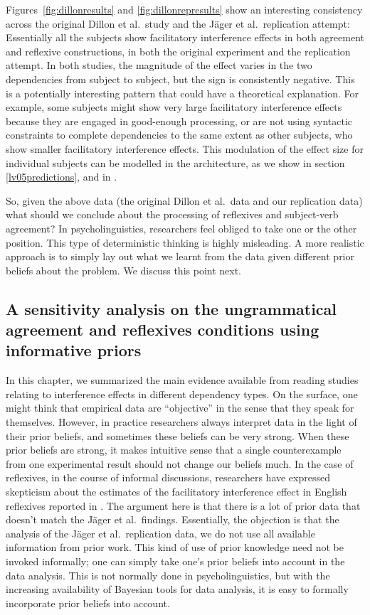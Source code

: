 \documentclass{cambridge7A}\usepackage[]{graphicx}\usepackage[]{color}
\begin{document}
Figures~\ref{fig:dillonresults} and \ref{fig:dillonrepresults} show an interesting consistency across the original Dillon et al.\ study and the J\"ager et al.\ replication attempt: Essentially all the subjects show facilitatory interference effects in both agreement and reflexive constructions, in both the original experiment and the replication attempt. In both studies, the magnitude of the effect varies in the two dependencies from subject to subject, but the sign is consistently negative. This is a potentially interesting pattern that could have a theoretical explanation. For example, some subjects might show very large facilitatory interference effects because  they are engaged in  good-enough processing, or are not using syntactic constraints to complete dependencies to the same extent as other subjects, who show smaller facilitatory interference effects. This modulation of the effect size for individual subjects can be modelled in the \cite{LewisVasishth2005} architecture, as we show in section \ref{lv05predictions}, and in \cite{YadavEtAlAMLaP2020}.

So, given the above data (the original Dillon et al.\ data and our replication  data) what should we conclude about the processing of reflexives and subject-verb agreement? In psycholinguistics, researchers feel obliged to take one or the other position. This type of deterministic thinking is highly misleading. A more realistic approach is to  simply lay out what we learnt from the data given different prior beliefs about the problem. We discuss this point next.

\subsection{A sensitivity analysis on the ungrammatical agreement and reflexives conditions using informative priors}

In this chapter, we summarized the main evidence available from reading studies relating to interference effects in different dependency types. On the surface, one might think that empirical data are ``objective'' in the sense that they speak for themselves. However, in practice researchers always interpret data in the light of their prior beliefs, and sometimes these beliefs can be very strong. When these prior beliefs are strong, it makes intuitive sense that a single counterexample from one experimental result should not change our beliefs much.  In the case of reflexives, in the course of informal discussions, researchers have expressed skepticism about the estimates of the facilitatory interference effect in English reflexives reported in \cite{JaegerMertzenVanDykeVasishth2019}. The argument here is that there is a lot of prior data that doesn't match the J\"ager et al.\ findings. Essentially, the objection is that  the analysis of the J\"ager et al.\ replication data, we do not use all available information from prior work. This kind of use of prior knowledge need not be invoked informally; one can simply take one's prior beliefs into account in the data analysis. This is not normally done in psycholinguistics, but with the increasing availability of Bayesian tools for data analysis, it is easy to formally incorporate prior beliefs into account. 
\end{document}

